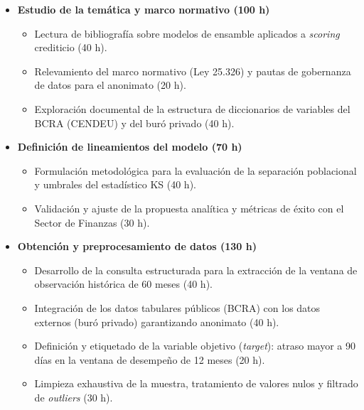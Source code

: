 \documentclass[
11pt, %
]{charter}
\begin{document}
\begin{itemize}

    \item \textbf{Estudio de la temática y marco normativo (100 h)}
    \begin{itemize}
        \item Lectura de bibliografía sobre modelos de ensamble aplicados a \textit{scoring} crediticio (40 h).
        \item Relevamiento del marco normativo (Ley 25.326) y pautas de gobernanza de datos para el anonimato (20 h).
        \item Exploración documental de la estructura de diccionarios de variables del BCRA (CENDEU) y del buró privado (40 h).
    \end{itemize}

    \item \textbf{Definición de lineamientos del modelo (70 h)}
    \begin{itemize}
        \item Formulación metodológica para la evaluación de la separación poblacional y umbrales del estadístico KS (40 h).
        \item Validación y ajuste de la propuesta analítica y métricas de éxito con el Sector de Finanzas (30 h).
    \end{itemize}

    \item \textbf{Obtención y preprocesamiento de datos (130 h)}
    \begin{itemize}
        \item Desarrollo de la consulta estructurada para la extracción de la ventana de observación histórica de 60 meses (40 h).
        \item Integración de los datos tabulares públicos (BCRA) con los datos externos (buró privado) garantizando anonimato (40 h).
        \item Definición y etiquetado de la variable objetivo (\textit{target}): atraso mayor a 90 días en la ventana de desempeño de 12 meses (20 h).
        \item Limpieza exhaustiva de la muestra, tratamiento de valores nulos y filtrado de \textit{outliers} (30 h).
    \end{itemize}


\end{itemize}
\end{document}
